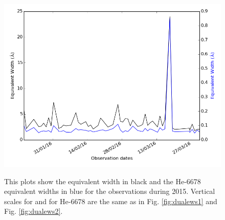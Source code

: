 \begin{figure}[!htbp]
\begin{center}
\includegraphics[scale=0.50]{Figures/dualcomb3.png} \\
\end{center}   
\caption{This plots show the {\ha} equivalent width in black and the He-6678 equivalent widths in blue for the {\harps}
  observations during 2015. Vertical scales for {\ha} and for He-6678 are the same as in Fig. \ref{fig:dualews1} and
  Fig. \ref{fig:dualews2}.}
 \protect\label{fig:dualews3}
\end{figure}

